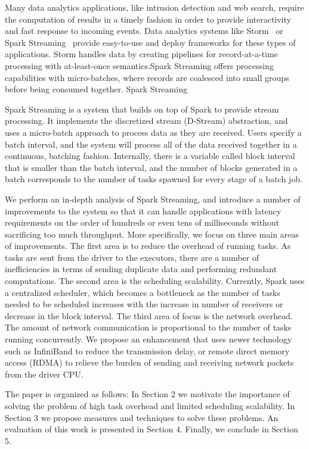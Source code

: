 \noindent

Many data analytics applications, like intrusion detection and web search, require the computation of results in a timely fashion in order to provide interactivity and fast response to incoming events.
Data analytics systems like Storm~\cite{Storm} or Spark Streaming~\cite{SparkStreaming} provide easy-to-use and deploy frameworks for these types of applications. Storm handles data by creating pipelines for record-at-a-time processing with at-least-once semantics.Spark Streaming offers processing capabilities with micro-batches, where records are coalesced into small groups before being consumed together.
Spark Streaming 


Spark Streaming is a system that builds on top of Spark to provide stream processing. It implements the discretized stream (D-Stream) abstraction, and uses a micro-batch approach to process data as they are received. Users specify a batch interval, and the system will process all of the data received together in a continuous, batching fashion. Internally, there is a variable called block interval that is smaller than the batch interval, and the number of blocks generated in a batch corresponds to the number of tasks spawned for every stage of a  batch job.

We perform an in-depth analysis of Spark Streaming, and introduce a number of improvements to the system so that it can handle applications with latency requirements on the order of hundreds or even tens of milliseconds without sacrificing too much throughput. More specifically, we focus on three main areas of improvements. The first area is to reduce the overhead of running tasks. As tasks are sent from the driver to the executors, there are a number of inefficiencies in terms of sending duplicate data and performing redundant computations. The second area is the scheduling scalability. Currently, Spark uses a centralized scheduler, which becomes a bottleneck as the number of tasks needed to be scheduled increases with the increase in number of receivers or decrease in the block interval. The third area of focus is the network overhead. The amount of network communication is proportional to the number of tasks running concurrently. We propose an enhancement that uses newer technology such as InfiniBand to reduce the transmission delay, or remote direct memory access (RDMA) to relieve the burden of sending and receiving network packets from the driver CPU.

The paper is organized as follows: In Section 2 we motivate the importance of solving the problem of high task overhead and limited scheduling scalability. In Section 3 we propose measures and techniques to solve these problems. An evaluation of this work is presented in Section 4. Finally, we conclude in Section 5.


